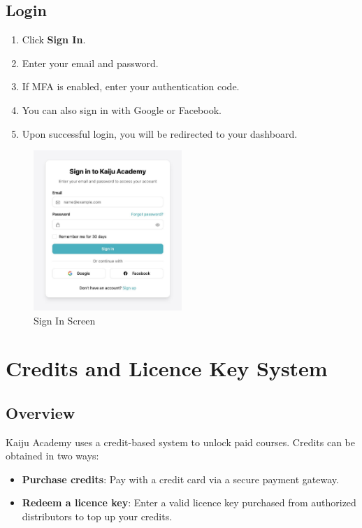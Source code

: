 \documentclass[a4paper,11pt]{scrartcl}
\begin{document}
\subsection{Login}
\begin{enumerate}[leftmargin=*]
    \item Click \textbf{Sign In}.
    \item Enter your email and password.
    \item If MFA is enabled, enter your authentication code.
    \item You can also sign in with Google or Facebook.
    \item Upon successful login, you will be redirected to your dashboard.
\end{enumerate}
\begin{figure}[H]
    \centering
    \includegraphics[width=0.5\textwidth]{SignIn.jpg}
    \caption{Sign In Screen}
\end{figure}

\section{Credits and Licence Key System}

\subsection{Overview}
Kaiju Academy uses a credit-based system to unlock paid courses. Credits can be obtained in two ways:
\begin{itemize}[leftmargin=*]
    \item \textbf{Purchase credits}: Pay with a credit card via a secure payment gateway.
    \item \textbf{Redeem a licence key}: Enter a valid licence key purchased from authorized distributors to top up your credits.
\end{itemize}
\end{document}
